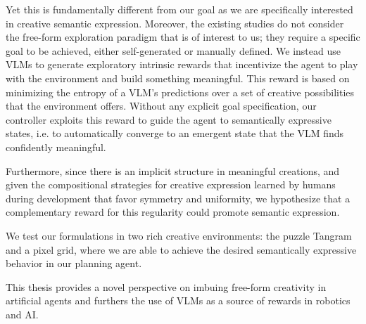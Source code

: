 Yet this is fundamentally different from our goal as we are specifically interested in creative semantic expression.
Moreover, the existing studies do not consider the free-form exploration paradigm that is of interest to us; they require a specific goal to be achieved, either self-generated or manually defined.
We instead use VLMs to generate exploratory intrinsic rewards that incentivize the agent to play with the environment and build something meaningful.
This reward is based on minimizing the entropy of a VLM's predictions over a set of creative possibilities that the environment offers.
Without any explicit goal specification, our controller exploits this reward to guide the agent to semantically expressive states, i.e. to automatically converge to an emergent state that the VLM finds confidently meaningful.

Furthermore, since there is an implicit structure in meaningful creations, and given the compositional strategies for creative expression learned by humans during development \citep{symmetry,compositional} that favor symmetry and uniformity, we hypothesize that a complementary reward for this regularity \citep{rair} could promote semantic expression.

We test our formulations in two rich creative environments: the puzzle Tangram and a pixel grid, where we are able to achieve the desired semantically expressive behavior in our planning agent.

This thesis provides a novel perspective on imbuing free-form creativity in artificial agents and furthers the use of VLMs as a source of rewards in robotics and AI.
